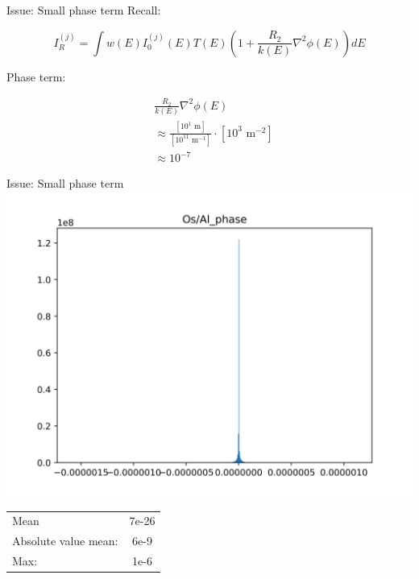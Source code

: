 \documentclass[presentation]{beamer}
\begin{document}
  \begin{frame}{Issue: Small phase term}
    Recall: 

    \begin{equation}
      I_R^{(j)} = \int w(E) I_0^{(j)}(E) T(E) \left(1 + \frac{R_2}{k(E)} \nabla^2 \phi(E)\right)dE
    \end{equation}

    Phase term:
    
    \begin{align}
      &\frac{R_2}{k(E)}\nabla^2 \phi(E)\\
      &\approx \frac{[10^1 \text{ m}]}{[10^{11} \text{ m}^{-1}]}\cdot [10^{3} \text{ m}^{-2}]\\
      &\approx 10^{-7}
    \end{align}
    
  \end{frame}

  \begin{frame}{Issue: Small phase term}
    \centering
    \includegraphics[width=0.8\linewidth]{figs/Al_phase}

  \begin{tabular}{l | c }
    Mean & 7e-26\\
    Absolute value mean: & 6e-9\\
    Max: & 1e-6\\
  \end{tabular}  

    
  \end{frame}
\end{document}
